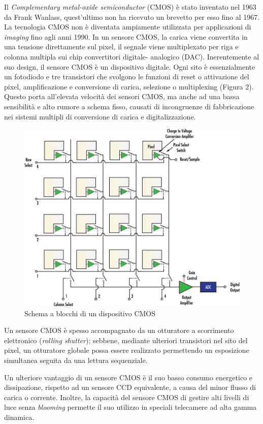 Il \emph{Complementary metal-oxide semiconductor} (CMOS) è stato inventato nel 1963
da Frank Wanlass, quest'ultimo non ha ricevuto un brevetto per esso fino al
1967. La tecnologia CMOS non è diventata ampiamente utilizzata per applicazioni di \emph{imaging} fino agli anni 1990. In un sensore CMOS, la carica viene
convertita in una tensione direttamente sul pixel, il segnale viene
multiplexato per riga e colonna multipla sui chip convertitori digitale-
analogico (DAC). Inerentemente al suo design, il sensore CMOS è un dispositivo
digitale. Ogni sito è essenzialmente un fotodiodo e tre transistori che
svolgono le funzioni di reset o attivazione del pixel, amplificazione e
conversione di carica,  selezione o multiplexing (Figura 2). Questo porta
all'elevata velocità dei sensori CMOS, ma anche ad una bassa sensibilità e alto
rumore a schema fisso, causati di incongruenze di fabbricazione nei sistemi
multipli di conversione di carica e digitalizzazione.
\begin{figure}[!ht]
\centering

\includegraphics[width=.6\textwidth]{img/cmos-blockdiagram.jpeg}

\caption{Schema a blocchi di un dispositivo CMOS}
\label{fig:ccd-blockdiagram}
\end{figure}

Un sensore CMOS è spesso accompagnato da un otturatore a scorrimento
elettronico (\emph{rolling shutter}); sebbene, mediante ulteriori transistori nel sito del
pixel, un otturatore globale possa essere realizzato permettendo un esposizione simultanea seguita da una lettura sequenziale.

Un ulteriore vantaggio di un sensore CMOS è il suo basso consumo energetico e
dissipazione, rispetto ad un sensore CCD equivalente, a causa del minor flusso
di carica o corrente. Inoltre, la capacità del sensore CMOS di gestire alti
livelli di luce senza \emph{blooming} permette il suo utilizzo in speciali telecamere
ad alta gamma dinamica.

